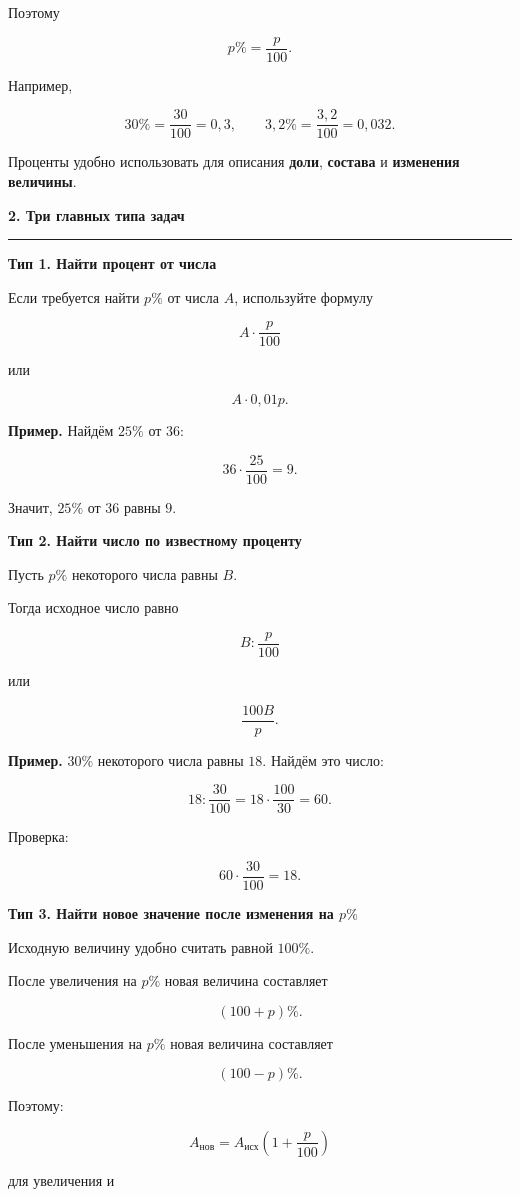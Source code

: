 \documentclass[a4paper,12pt]{article}
\newcommand{\sectiontitle}[1]{%
    \vspace{0.6em}
    {\Large\bfseries\color{darkaccent}#1\par}
    \vspace{0.15em}
    {\color{accent}\rule{\linewidth}{0.6pt}}
    \vspace{0.4em}
}
\newcommand{\subsectiontitle}[1]{%
    \vspace{0.35em}
    {\large\bfseries\color{accent}#1\par}
    \vspace{0.15em}
}
\newcommand{\key}[1]{\textbf{\textcolor{darkaccent}{#1}}}
\begin{document}
Поэтому

\[
p\%=\frac{p}{100}.
\]

Например,

\[
30\%=\frac{30}{100}=0{,}3,
\qquad
3{,}2\%=\frac{3{,}2}{100}=0{,}032.
\]

Проценты удобно использовать для описания \key{доли}, \key{состава} и
\key{изменения величины}.

\sectiontitle{2. Три главных типа задач}

\subsectiontitle{Тип 1. Найти процент от числа}

Если требуется найти \(p\%\) от числа \(A\), используйте формулу

\[
\boxed{
A\cdot\frac{p}{100}
}
\]

или

\[
\boxed{
A\cdot 0{,}01p.
}
\]

\key{Пример.} Найдём \(25\%\) от \(36\):

\[
36\cdot\frac{25}{100}=9.
\]

Значит, \(25\%\) от \(36\) равны \(9\).

\subsectiontitle{Тип 2. Найти число по известному проценту}

Пусть \(p\%\) некоторого числа равны \(B\).

Тогда исходное число равно

\[
\boxed{
B:\frac{p}{100}
}
\]

или

\[
\boxed{
\frac{100B}{p}.
}
\]

\key{Пример.} \(30\%\) некоторого числа равны \(18\). Найдём это число:

\[
18:\frac{30}{100}
=
18\cdot\frac{100}{30}
=
60.
\]

Проверка:

\[
60\cdot\frac{30}{100}=18.
\]

\subsectiontitle{Тип 3. Найти новое значение после изменения на \(p\%\)}

Исходную величину удобно считать равной \(100\%\).

После увеличения на \(p\%\) новая величина составляет

\[
(100+p)\%.
\]

После уменьшения на \(p\%\) новая величина составляет

\[
(100-p)\%.
\]

Поэтому:

\[
\boxed{
A_{\text{нов}}
=
A_{\text{исх}}
\left(1+\frac{p}{100}\right)
}
\]

для увеличения и
\end{document}
